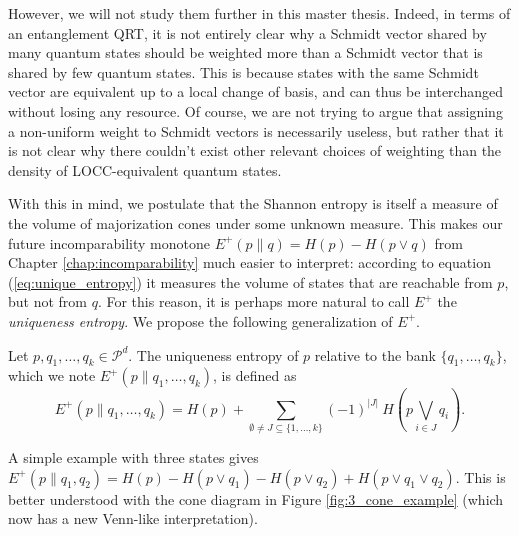 However, we will not study them further in this master thesis. Indeed, in terms of an entanglement QRT, it is not entirely clear why a Schmidt vector shared by many quantum states should be weighted more than a Schmidt vector that is shared by few quantum states. This is because states with the same Schmidt vector are equivalent up to a local change of basis, and can thus be interchanged without losing any resource. Of course, we are not trying to argue that assigning a non-uniform weight to Schmidt vectors is necessarily useless, but rather that it is not clear why there couldn't exist other relevant choices of weighting than the density of LOCC-equivalent quantum states.

With this in mind, we postulate that the Shannon entropy is itself a measure of the volume of majorization cones under some unknown measure. This makes our future incomparability monotone $E^+(p \parallel q) = H(p) - H(p \vee q)$ from Chapter \ref{chap:incomparability} much easier to interpret: according to equation (\ref{eq:unique_entropy}) it measures the volume of states that are reachable from $p$, but not from $q$. For this reason, it is perhaps more natural to call $E^+$ the \textit{uniqueness entropy}. We propose the following generalization of $E^+$.

\begin{definition} \label{def:unique_entropy}
    Let $p, q_1, \dots, q_k \in \mathcal{P}^d$. The uniqueness entropy of $p$ relative to the bank $\{q_1, \dots, q_k\}$, which we note $E^+(p \parallel q_1, \dots, q_k)$, is defined as 
    \begin{equation} \label{eq:unique_entropy}
        E^+(p \parallel q_1, \dots, q_k) = H(p) + \sum_{\emptyset \neq J \subseteq \{1, \dots, k\}} (-1)^{|J|} \: H\left(p \bigvee\limits_{i \in J} q_i\right).
    \end{equation}
\end{definition}

A simple example with three states gives $E^+(p \parallel q_1, q_2) = H(p) - H(p \vee q_1) - H(p \vee q_2) + H(p \vee q_1 \vee q_2)$. This is better understood with the cone diagram in Figure \ref{fig:3_cone_example} (which now has a new Venn-like interpretation).

